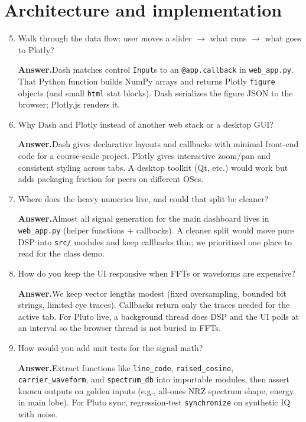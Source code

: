 \documentclass[11pt]{article}
\newenvironment{qaitem}{%
  \begin{enumerate}[label=\textbf{Q\arabic*.}, leftmargin=2.2em, itemsep=1.1em, listparindent=0pt]
}{%
  \end{enumerate}%
}
\newcommand{\Ans}{\par\noindent\textbf{Answer.}\quad}
\begin{document}
\section*{Architecture and implementation}

\begin{qaitem}
  \setcounter{enumi}{4}
  \item Walk through the data flow: user moves a slider $\rightarrow$ what runs $\rightarrow$ what goes to Plotly?
  \Ans Dash matches control \texttt{Input}s to an \texttt{@app.callback} in \texttt{web\_app.py}. That Python function builds NumPy arrays and returns Plotly \texttt{figure} objects (and small \texttt{html} stat blocks). Dash serializes the figure JSON to the browser; Plotly.js renders it.

  \item Why Dash and Plotly instead of another web stack or a desktop GUI?
  \Ans Dash gives declarative layouts and callbacks with minimal front-end code for a course-scale project. Plotly gives interactive zoom/pan and consistent styling across tabs. A desktop toolkit (Qt, etc.) would work but adds packaging friction for peers on different OSes.

  \item Where does the heavy numerics live, and could that split be cleaner?
  \Ans Almost all signal generation for the main dashboard lives in \texttt{web\_app.py} (helper functions + callbacks). A cleaner split would move pure DSP into \texttt{src/} modules and keep callbacks thin; we prioritized one place to read for the class demo.

  \item How do you keep the UI responsive when FFTs or waveforms are expensive?
  \Ans We keep vector lengths modest (fixed oversampling, bounded bit strings, limited eye traces). Callbacks return only the traces needed for the active tab. For Pluto live, a background thread does DSP and the UI polls at an interval so the browser thread is not buried in FFTs.

  \item How would you add unit tests for the signal math?
  \Ans Extract functions like \texttt{line\_code}, \texttt{raised\_cosine}, \texttt{carrier\_waveform}, and \texttt{spectrum\_db} into importable modules, then assert known outputs on golden inputs (e.g., all-ones NRZ spectrum shape, energy in main lobe). For Pluto sync, regression-test \texttt{synchronize} on synthetic IQ with noise.
\end{qaitem}
\end{document}
